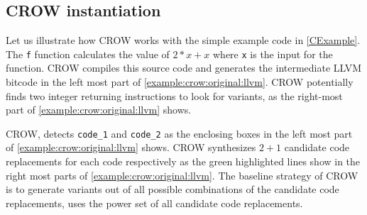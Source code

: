 \subsection*{CROW instantiation}

Let us illustrate how CROW works with the simple example code in \autoref{CExample}. The \texttt{f} function calculates the value of $2 * x + x$ where \texttt{x} is the input for the function.  CROW compiles this source code and generates the intermediate LLVM bitcode in the left most part of \autoref{example:crow:original:llvm}. CROW potentially finds two integer returning instructions to look for variants, as the right-most part of \autoref{example:crow:original:llvm} shows.


    

CROW, detects \texttt{code\_1} and \texttt{code\_2} as the enclosing boxes in the left most part of \autoref{example:crow:original:llvm} shows. CROW synthesizes $2 + 1$ candidate code replacements for each code respectively as the green highlighted lines show in the right most parts of \autoref{example:crow:original:llvm}.
The baseline strategy of CROW is to generate variants out of all possible combinations of the candidate code replacements, \ie uses the power set of all candidate code replacements.


